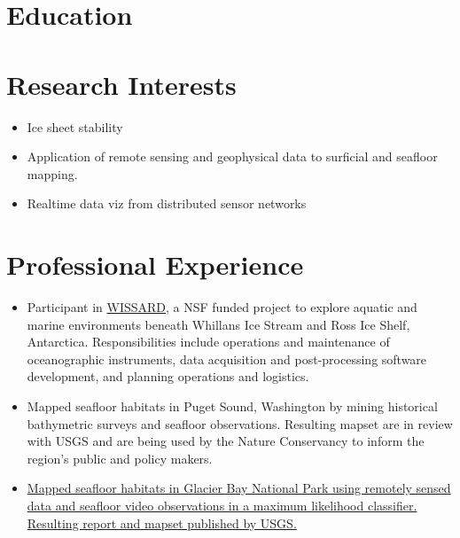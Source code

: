 \documentclass{cv_TOH}
\begin{document}
 
\section{Education}

\section{Research Interests}
\begin{itemize}
\item Ice sheet stability
\item Application of remote sensing and geophysical data to surficial and seafloor mapping. 
\item Realtime data viz from distributed sensor networks
\end{itemize}
\section{Professional Experience}


\begin{itemize}
\item Participant in \href{http://www.wissard.org}{WISSARD}, a NSF funded project to explore aquatic and marine environments beneath Whillans Ice Stream and Ross Ice Shelf, Antarctica. Responsibilities include operations and maintenance of oceanographic instruments, data acquisition and post-processing software development, and planning operations and logistics.
\item Mapped seafloor habitats in Puget Sound, Washington by mining historical bathymetric surveys and seafloor observations. Resulting mapset are in review with USGS and are being used by the Nature Conservancy to inform the region's public and policy makers.
\item \href{http://pubs.usgs.gov/sim/3253/}{Mapped seafloor habitats in Glacier Bay National Park using remotely sensed data and seafloor video observations in a maximum likelihood classifier. Resulting report and mapset published by USGS.}
\end{itemize}
\end{document}
